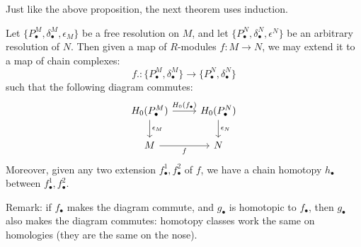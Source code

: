 Just like the above proposition, the next theorem uses induction. 
\begin{thm}
    Let $\{P_\bullet^M, \delta_\bullet^M, \epsilon_M\}$ be a free resolution on $M$, and let $\{P_\bullet^N, \delta_\bullet^N, \epsilon^N\}$ be an arbitrary resolution of $N$. Then given a map of $R$-modules $f: M\to N$, we may extend it to a map of chain complexes:
    \begin{equation*}
        f.: \{P_\bullet^M, \delta_\bullet^M\}\to \{P_\bullet^N, \delta_\bullet^N\}
    \end{equation*}
    such that the following diagram commutes:
    \[\begin{tikzcd}
        {H_0(P_\bullet^M)} & {H_0(P_\bullet^N)} \\
        M & N
        \arrow["{H_0(f_\bullet)}", from=1-1, to=1-2]
        \arrow["{\epsilon_M}", from=1-1, to=2-1]
        \arrow["{\epsilon_N}", from=1-2, to=2-2]
        \arrow["f"', from=2-1, to=2-2]
    \end{tikzcd}\]
    Moreover, given any two extension $f_\bullet^1, f_\bullet^2$ of $f$, we have a chain homotopy $h_\bullet$ between $f_\bullet^1, f_\bullet^2$.
\end{thm}
Remark: if $f_\bullet$ makes the diagram commute, and $g_\bullet$ is homotopic to $f_\bullet$, then $g_\bullet$ also makes the diagram commutes: homotopy classes work the same on homologies (they are the same on the nose).
